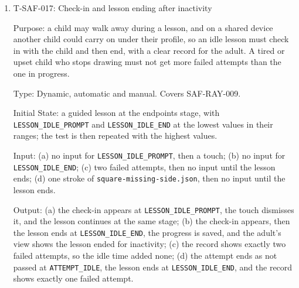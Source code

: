\documentclass[12pt, titlepage]{article}
\newcommand{\testitem}[1]{\item #1\par\nopagebreak}
\begin{document}
\begin{enumerate}
Initial State: the code for every animation and transition on child-facing
screens, and Squigglr open on the iPad with a guided lesson ready.

Input: (a) a team member who did not write it reviews every animation and
transition used on child-facing screens, which are all defined in
Squigglr's own code and style sheets; (b) on the iPad, the screens that
animate (all feedback, the lesson-end message, the inactivity check-in and
the screen transitions) are screen-recorded.

Output: (a) no animation or transition changes brightness or colour more
than three times in any one second; (b) stepping through each recording
frame by frame, no one-second window has more than three flashes.

Test Case Derivation: the fit criterion of SAF-MOU-003 and WCAG 2.2
success criterion 2.3.1 \citep{wcag22}. Because every animation comes from
our own code, reviewing that code finds a flashing effect before it reaches
a screen; the recordings then confirm the result on the device, without
recording every screen.

How test will be performed: once per revision (Rev~0 and Rev~1), as part of
the safety inspection; any problem is recorded as a GitHub issue labelled
\texttt{safety}.

\testitem{T-SAF-017: Check-in and lesson ending after inactivity}

Purpose: a child may walk away during a lesson, and on a shared device
another child could carry on under their profile, so an idle lesson must
check in with the child and then end, with a clear record for the adult. A
tired or upset child who stops drawing must not get more failed attempts
than the one in progress.

Type: Dynamic, automatic and manual. Covers SAF-RAY-009.

Initial State: a guided lesson at the endpoints stage, with
\texttt{LESSON\_IDLE\_PROMPT} and \texttt{LESSON\_IDLE\_END} at the lowest
values in their ranges; the test is then repeated with the highest values.

Input: (a) no input for \texttt{LESSON\_IDLE\_PROMPT}, then a touch; (b) no
input for \texttt{LESSON\_IDLE\_END}; (c) two failed attempts, then no input
until the lesson ends; (d) one stroke of
\texttt{square-\allowbreak{}missing-\allowbreak{}side.json}, then no input
until the lesson ends.

Output: (a) the check-in appears at \texttt{LESSON\_IDLE\_PROMPT}, the touch
dismisses it, and the lesson continues at the same stage; (b) the check-in
appears, then the lesson ends at \texttt{LESSON\_IDLE\_END}, the progress is
saved, and the adult's view shows the lesson ended for inactivity; (c) the
record shows exactly two failed attempts, so the idle time added none; (d)
the attempt ends as not passed at \texttt{ATTEMPT\_IDLE}, the lesson ends at
\texttt{LESSON\_IDLE\_END}, and the record shows exactly one failed attempt.


\end{enumerate}
\end{document}
